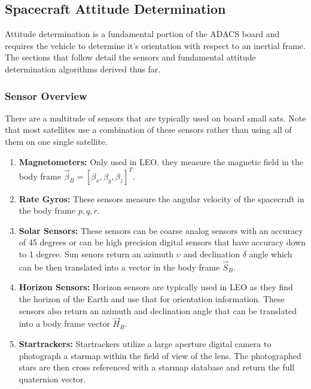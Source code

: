 \subsection{Spacecraft Attitude Determination}

Attitude determination is a fundamental portion of the ADACS board and
requires the vehicle to determine it's orientation with respect to an
inertial frame. The sections that follow detail the sensors and
fundamental attitude determination algorithms derived thus far. 

\subsubsection{Sensor Overview}

There are a multitude of sensors that are typically used on board
small sats. Note that most satellites use a combination of these
sensors rather than using all of them on one single satellite.

\begin{enumerate}[itemsep=-5pt]
  \item {\bf Magnetometers:} Only used in LEO, they measure the
    magnetic field in the body frame $\vec{\beta}_B = [\beta_x,\beta_y,\beta_z]^T$.
    \item {\bf Rate Gyros:} These sensors measure the angular velocity
      of the spacecraft in the body frame $p,q,r$.
    \item {\bf Solar Sensors:} These sensors can be coarse analog
      sensors with an accuracy of 45 degrees or can be high precision
      digital sensors that have accuracy down to 1 degree. Sun senors
      return an azimuth $\upsilon$ and declination $\delta$ angle which can be then
      translated into a vector in the body frame $\vec{S}_B$.
    \item {\bf Horizon Sensors:} Horizon sensors are typically used in
      LEO as they find the horizon of the Earth and use that for
      orientation information. These sensors also return an azimuth
      and declination angle that can be translated into a body frame
      vector $\vec{H}_B$.
      \item {\bf Startrackers:} Startrackers utilize a large aperture
        digital camera to photograph a starmap within the field of
        view of the lens. The photographed stars are then cross
        referenced with a starmap database and return the full
        quaternion vector.
\end{enumerate}

